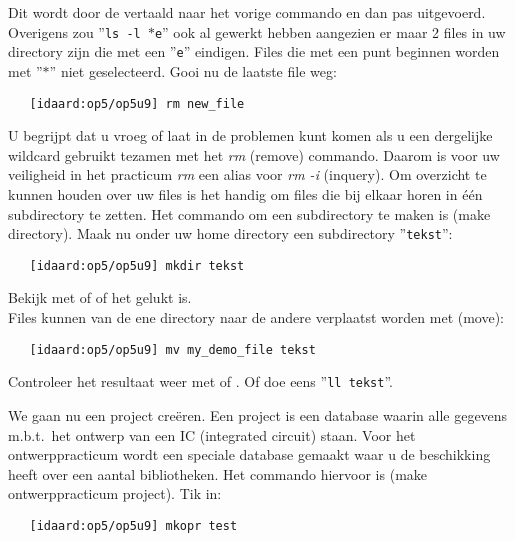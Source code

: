 Dit wordt door de  vertaald naar het vorige commando
en dan pas uitgevoerd.
Overigens zou ''{\tt ls -l $\ast$e}'' ook al gewerkt hebben
aangezien er maar 2 files in uw directory zijn
die met een ''{\tt e}'' eindigen.
Files die met een punt beginnen worden met ''{\tt $\ast$}'' niet geselecteerd.
\newline
Gooi nu de laatste file weg:
\begin{verbatim}
   [idaard:op5/op5u9] rm new_file
\end{verbatim}

U begrijpt dat u vroeg of laat 
in de problemen kunt komen als u een dergelijke wildcard gebruikt tezamen
met het {\em rm} (remove) commando.
Daarom is voor uw veiligheid
in het practicum {\em rm} een alias voor {\em rm -i} (inquery).
\newline
Om overzicht te kunnen houden over uw files is het handig om files die bij elkaar horen in \'e\'en subdirectory te zetten. Het commando om een subdirectory te maken is  (make directory).
Maak nu onder uw home directory een subdirectory ''{\tt tekst}'':
\begin{verbatim}
   [idaard:op5/op5u9] mkdir tekst
\end{verbatim}

Bekijk met  of  of het gelukt is.\\
Files kunnen van de ene directory naar de andere verplaatst worden met  (move):
\begin{verbatim}
   [idaard:op5/op5u9] mv my_demo_file tekst
\end{verbatim}

Controleer het resultaat weer met  of .
Of doe eens ''{\tt ll tekst}''.

We gaan nu een  project cre\"eren.
Een  project 
is een database waarin alle gegevens m.b.t.\ het ontwerp van een IC (integrated circuit) staan.
Voor het ontwerppracticum wordt een speciale database gemaakt waar u de beschikking heeft over een aantal bibliotheken.
Het commando hiervoor is  (make ontwerppracticum project).
Tik in:
\begin{verbatim}
   [idaard:op5/op5u9] mkopr test
\end{verbatim}

